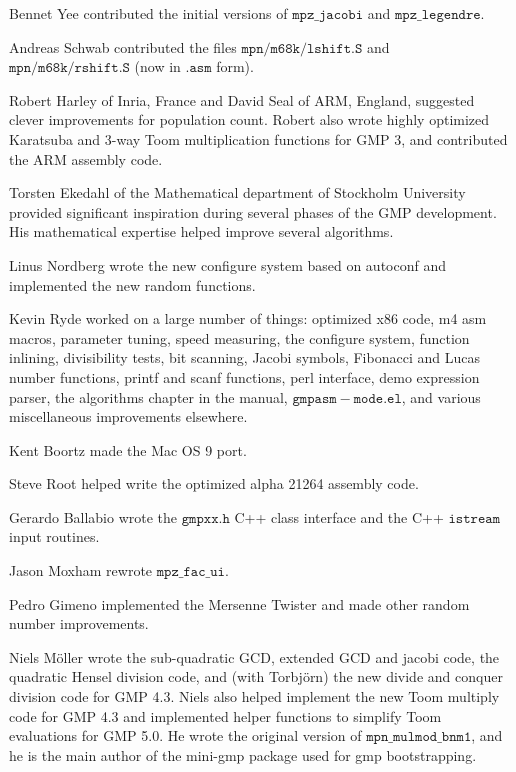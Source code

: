 \vpara
Bennet Yee contributed the initial versions of $\mathtt{mpz\_jacobi}$ and
$\mathtt{mpz\_legendre}$.

\vpara
Andreas Schwab contributed the files $\mathtt{mpn/m68k/lshift.S}$ and
$\mathtt{mpn/m68k/rshift.S}$ (now in $\mathtt{.asm}$ form).

\vpara
Robert Harley of Inria, France and David Seal of ARM, England, suggested clever
improvements for population count.  Robert also wrote highly optimized
Karatsuba and 3-way Toom multiplication functions for GMP 3, and contributed
the ARM assembly code.

\vpara
Torsten Ekedahl of the Mathematical department of Stockholm University provided
significant inspiration during several phases of the GMP development.  His
mathematical expertise helped improve several algorithms.

\vpara
Linus Nordberg wrote the new configure system based on autoconf and
implemented the new random functions.

\vpara
Kevin Ryde worked on a large number of things: optimized x86 code, m4 asm
macros, parameter tuning, speed measuring, the configure system, function
inlining, divisibility tests, bit scanning, Jacobi symbols, Fibonacci and Lucas
number functions, printf and scanf functions, perl interface, demo expression
parser, the algorithms chapter in the manual, $\mathtt{gmpasm-mode.el}$, and
various miscellaneous improvements elsewhere.

\vpara
Kent Boortz made the Mac OS 9 port.

\vpara
Steve Root helped write the optimized alpha 21264 assembly code.

\vpara
Gerardo Ballabio wrote the $\mathtt{gmpxx.h}$ C++ class interface and the C++
$\mathtt{istream}$ input routines.

\vpara
Jason Moxham rewrote $\mathtt{mpz\_fac\_ui}$.

\vpara
Pedro Gimeno implemented the Mersenne Twister and made other random number
improvements.

\vpara
Niels M\"oller wrote the sub-quadratic GCD, extended GCD and jacobi code, the
quadratic Hensel division code, and (with Torbj\"orn) the new divide and
conquer division code for GMP 4.3.  Niels also helped implement the new Toom
multiply code for GMP 4.3 and implemented helper functions to simplify Toom
evaluations for GMP 5.0.  He wrote the original version of $\mathtt{mpn\_mulmod\_bnm1}$, and
he is the main author of the mini-gmp package used for gmp bootstrapping.

